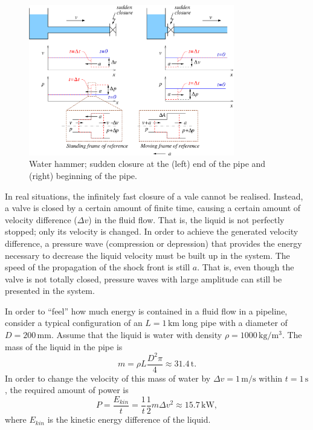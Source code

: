 \begin{figure}[h!]
\centering
\includegraphics[width=0.8\textwidth]{figs/water_hammer_CV.pdf}
\caption{\label{fig:water_hammer}Water hammer; sudden closure at the (left) end of the pipe and (right) beginning of the pipe.}
\end{figure}

In real situations, the infinitely fast closure of a vale cannot be realised. Instead, a valve is closed by a certain amount of finite time, causing a certain amount of velocity difference ($\Delta v$) in the fluid flow. That is, the liquid is not perfectly stopped; only its velocity is changed. In order to achieve the generated velocity difference, a pressure wave (compression or depression) that provides the energy necessary to decrease the liquid velocity must be built up in the system. The speed of the propagation of the shock front is still $a$. That is, even though the valve is not totally closed, pressure waves with large amplitude can still be presented in the system.

In order to ``feel'' how much energy is contained in a fluid flow in a pipeline, consider a typical configuration of an $L=1\,\mathrm{km}$ long pipe with a diameter of $D=200\,\mathrm{mm}$. Assume that the liquid is water with density $\rho=1000\,\mathrm{kg/m^3}$. The mass of the liquid in the pipe is
%
\begin{equation}
m = \rho L \frac{D^2 \pi}{4} \approx 31.4\,\mathrm{t}.
\end{equation}
%
In order to change the velocity of this mass of water by $\Delta v=1\,\mathrm{m/s}$ within $t=1\,\mathrm{s}$, the required amount of power is
%
\begin{equation}
P = \frac{E_{kin}}{t} = \frac{1}{t} \frac{1}{2} m \Delta v^2 \approx 15.7\,\mathrm{kW},
\end{equation}
%
where $E_{kin}$ is the kinetic energy difference of the liquid.

